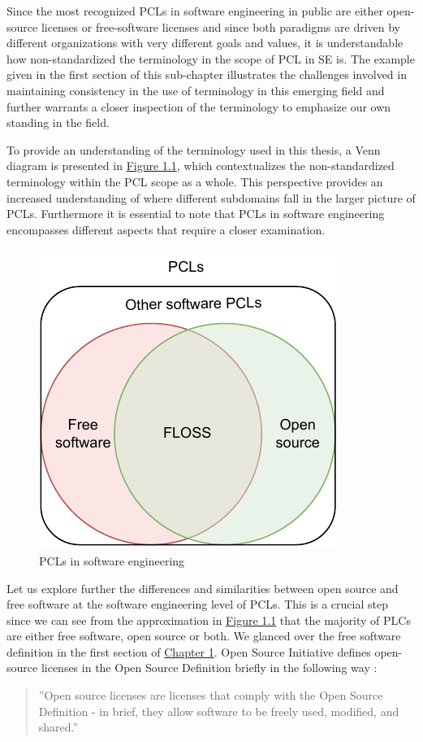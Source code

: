 Since the most recognized PCLs in software engineering in public are either open-source licenses or free-software licenses and since both paradigms are driven by different organizations with very different goals and values, it is understandable how non-standardized the terminology in the scope of PCL in SE is. The example given in the first section of this sub-chapter illustrates the challenges involved in maintaining consistency in the use of terminology in this emerging field and further warrants a closer inspection of the terminology to emphasize our own standing in the field.

To provide an understanding of the terminology used in this thesis, a Venn diagram is presented in \hyperref[fig:terms]{Figure 1.1}, which contextualizes the non-standardized terminology within the PCL scope as a whole. This perspective provides an increased understanding of where different subdomains fall in the larger picture of PCLs. Furthermore it is essential to note that PCLs in software engineering encompasses different aspects that require a closer examination.

\begin{figure}[t]
	\centering
	\includegraphics[scale=1.5]{figures/terms-diagram.pdf}
	\caption{PCLs in software engineering}
	\label{fig:terms}
\end{figure}

Let us explore further the differences and similarities between open source and free software at the software engineering level of PCLs. This is a crucial step since we can see from the approximation in \hyperref[fig:terms]{Figure 1.1} that the majority of PLCs are either free software, open source or both. We glanced over the free software definition in the first section of \hyperref[intro]{Chapter 1}. Open Source Initiative defines open-source licenses in the Open Source Definition briefly in the following way :
\begin{quote}
	''Open source licenses are licenses that comply with the Open Source Definition - in brief, they allow software to be freely used, modified, and shared.''
\end{quote}

